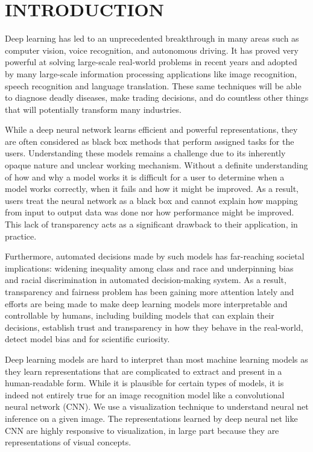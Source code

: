%
%
\chapter{INTRODUCTION}
\thispagestyle{empty}

Deep learning has led to an unprecedented breakthrough in many areas such as computer vision, voice recognition, and autonomous driving.  It has proved very powerful at solving large-scale real-world problems in recent years and adopted by many large-scale information processing applications like image recognition, speech recognition and language translation.  These same techniques will be able to diagnose deadly diseases,  make trading decisions, and do countless other things that will potentially transform many industries. 

While a deep neural network learns efficient and powerful representations, they are often considered as black box methods that perform assigned tasks for the users.  Understanding these models remains a challenge due to its inherently opaque nature and unclear working mechanism.  Without a definite understanding of how and why a model works it is difficult for a user to determine when a model works correctly, when it fails and how it might be improved. As a result, users treat the neural network as a black box and cannot explain how mapping from input to output data was done nor how performance might be improved. This lack of transparency acts as a significant drawback to their application, in practice.

Furthermore, automated decisions made by such models has far-reaching societal implications: widening inequality among class and race and underpinning bias and racial discrimination in automated decision-making system. As a result, transparency and fairness problem has been gaining more attention lately and efforts are being made to make deep learning models more interpretable and controllable by humans,  including building models that can explain their decisions, establish trust and transparency in how they behave in the real-world, detect model bias and for scientific curiosity.

Deep learning models are hard to interpret than most machine learning models as they learn representations that are complicated to extract and present in a human-readable form.  While it is plausible for certain types of models, it is indeed not entirely true for an image recognition model like a convolutional neural network (CNN).  We use a visualization technique to understand neural net inference on a given image.  The representations learned by deep neural net like CNN are highly responsive to visualization, in large part because they are representations of visual concepts.

